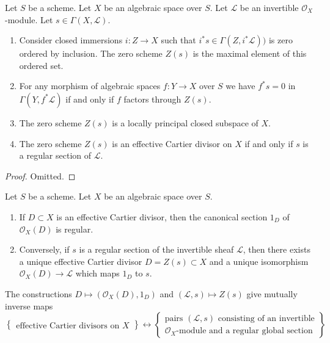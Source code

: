\begin{lemma}
\label{lemma-zero-scheme}
Let $S$ be a scheme. Let $X$ be an algebraic space over $S$.
Let $\mathcal{L}$ be an invertible $\mathcal{O}_X$-module.
Let $s \in \Gamma(X, \mathcal{L})$.
\begin{enumerate}
\item Consider closed immersions $i : Z \to X$ such that
$i^*s \in \Gamma(Z, i^*\mathcal{L}))$ is zero
ordered by inclusion. The zero scheme $Z(s)$ is the
maximal element of this ordered set.
\item For any morphism of algebraic spaces $f : Y \to X$ over $S$
we have $f^*s = 0$ in $\Gamma(Y, f^*\mathcal{L})$ if and only if
$f$ factors through $Z(s)$.
\item The zero scheme $Z(s)$ is a locally principal closed subspace of $X$.
\item The zero scheme $Z(s)$ is an effective Cartier divisor on $X$
if and only if $s$ is a regular section of $\mathcal{L}$.
\end{enumerate}
\end{lemma}

\begin{proof}
Omitted.
\end{proof}

\begin{lemma}
\label{lemma-characterize-OD}
Let $S$ be a scheme. Let $X$ be an algebraic space over $S$.
\begin{enumerate}
\item If $D \subset X$ is an effective Cartier divisor, then
the canonical section $1_D$ of $\mathcal{O}_X(D)$ is regular.
\item Conversely, if $s$ is a regular section of the invertible
sheaf $\mathcal{L}$, then there exists a unique effective
Cartier divisor $D = Z(s) \subset X$ and a unique isomorphism
$\mathcal{O}_X(D) \to \mathcal{L}$ which maps $1_D$ to $s$.
\end{enumerate}
The constructions
$D \mapsto (\mathcal{O}_X(D), 1_D)$ and $(\mathcal{L}, s) \mapsto Z(s)$
give mutually inverse maps
$$
\left\{
\begin{matrix}
\text{effective Cartier divisors on }X
\end{matrix}
\right\}
\leftrightarrow
\left\{
\begin{matrix}
\text{pairs }(\mathcal{L}, s)\text{ consisting of an invertible}\\
\mathcal{O}_X\text{-module and a regular global section}
\end{matrix}
\right\}
$$
\end{lemma}

